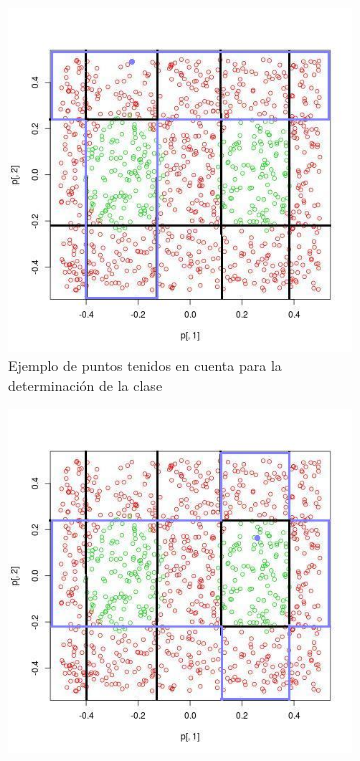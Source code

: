 \documentclass[12pt, a4paper]{article}
\begin{document}
\begin{figure}
    \centering
      ~ %
    \begin{subfigure}[b]{0.35\textwidth}
        \includegraphics[width=\textwidth]{dos_elipses_ej1}
        \caption{Ejemplo de puntos tenidos en cuenta para la determinación de la clase}
    \end{subfigure}
    \begin{subfigure}[b]{0.35\textwidth}
        \includegraphics[width=\textwidth]{dos_elipses_ej2}

\end{subfigure}
\end{figure}
\end{document}
